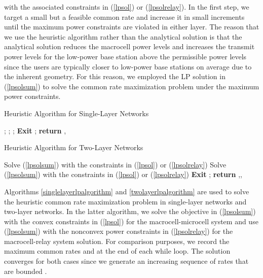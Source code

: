 \documentclass[conference,letterpaper,final,10pt]{IEEEtran}
\begin{document}
with the associated constraints in (\ref{lpsol}) or (\ref{lpsolrelay}). In the first step, we target a small but a feasible common rate  and increase it in small  increments until the maximum power constraints are violated in either layer. The reason that we use the heuristic algorithm rather than the analytical solution is that the analytical solution reduces the macrocell power levels and increases the transmit power levels for the low-power base station above the permissible power levels since the users are typically closer to low-power base stations on average due to the inherent geometry. For this reason, we employed the LP solution in (\ref{lpsolsum}) to solve the common rate maximization problem under the maximum power constraints. \begin{algorithm}
  \caption{Heuristic Algorithm for Single-Layer Networks}\label{singlelayerlpalgorithm}
  \begin{algorithmic}[1]
      \While{}
        \State ;
        \If{, }
             \State ; ; \textbf{Exit}
        \Else
            \State ;
        \EndIf
      \EndWhile\label{euclidendwhile}
      \State \textbf{return} ,
  \end{algorithmic}
\end{algorithm}
\begin{algorithm}
  \caption{Heuristic Algorithm for Two-Layer Networks}\label{twolayerlpalgorithm}
  \begin{algorithmic}[1]
      \While{}
        \State Solve (\ref{lpsolsum}) with the constraints in (\ref{lpsol}) or (\ref{lpsolrelay})
        \If{  ,  }
             \State 
             \State Solve (\ref{lpsolsum}) with the constraints in (\ref{lpsol}) or (\ref{lpsolrelay})
             \State \textbf{Exit}
        \Else
            \State ;
        \EndIf
      \EndWhile\label{euclidendwhile}
      \State \textbf{return} ,,
  \end{algorithmic}
\end{algorithm}

Algorithms \ref{singlelayerlpalgorithm} and \ref{twolayerlpalgorithm} are used to solve the heuristic common rate maximization problem in single-layer networks and two-layer networks. In the latter algorithm, we solve the objective in (\ref{lpsolsum}) with the convex constraints in (\ref{lpsol}) for the macrocell-microcell system and use (\ref{lpsolsum}) with the nonconvex power constraints in (\ref{lpsolrelay}) for the macrocell-relay system solution. For comparison purposes, we record the maximum common rates  and  at the end of each while loop. The solution converges for both cases since we generate an increasing sequence of rates that are bounded \cite{RamanConf}.
\end{document}
